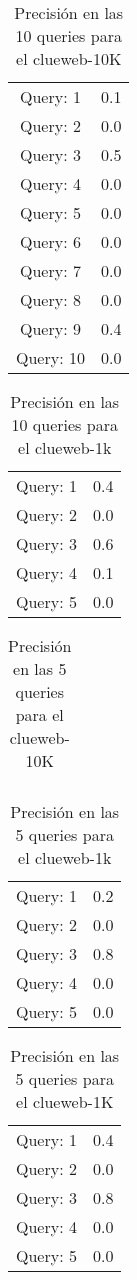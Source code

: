 \begin{table}
\centering
\begin{tabular}{cc}
Query: 1&0.1
\\
Query: 2&0.0
\\
Query: 3&0.5
\\
Query: 4&0.0
\\
Query: 5&0.0
\\
Query: 6&0.0
\\
Query: 7&0.0
\\
Query: 8&0.0
\\
Query: 9&0.4
\\
Query: 10&0.0
\\
\end{tabular}
\caption{Precisi\'{o}n en las 10 queries para el clueweb-10K}
\end{table}
\begin{table}
\centering
\begin{tabular}{cc}
Query: 1&0.4
\\
Query: 2&0.0
\\
Query: 3&0.6
\\
Query: 4&0.1
\\
Query: 5&0.0
\\
\end{tabular}
\caption{Precisi\'{o}n en las 10 queries para el clueweb-1k}
\end{table}
\begin{table}
\centering
\begin{tabular}{cc}
\end{tabular}
\caption{Precisi\'{o}n en las 5 queries para el clueweb-10K}
\end{table}
\begin{table}
\centering
\begin{tabular}{cc}
Query: 1&0.2
\\
Query: 2&0.0
\\
Query: 3&0.8
\\
Query: 4&0.0
\\
Query: 5&0.0
\\
\end{tabular}
\caption{Precisi\'{o}n en las 5 queries para el clueweb-1k}
\end{table}
\begin{table}
\centering
\begin{tabular}{cc}
Query: 1&0.4
\\
Query: 2&0.0
\\
Query: 3&0.8
\\
Query: 4&0.0
\\
Query: 5&0.0
\\
\end{tabular}
\caption{Precisi\'{o}n en las 5 queries para el clueweb-1K}
\end{table}
